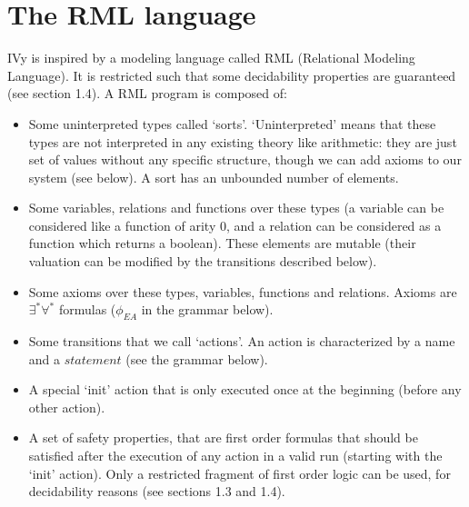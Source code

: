 \documentclass[11pt,a4paper,oldfontcommands,openany]{memoir}
\begin{document}
    \section{The RML language}

    IVy is inspired by a modeling language called RML (Relational Modeling Language). It is restricted such that some decidability properties are guaranteed (see section 1.4).
    A RML program is composed of:
    \begin{itemize}
        \item Some uninterpreted types called `sorts'. `Uninterpreted' means that these types are not interpreted in any existing theory like arithmetic:
        they are just set of values without any specific structure, though we can add axioms to our system (see below).
        A sort has an unbounded number of elements.
        \item Some variables, relations and functions over these types (a variable can be considered like a function of arity 0, and a relation can be considered as a function
        which returns a boolean). These elements are mutable (their valuation can be modified by the transitions described below).
        \item Some axioms over these types, variables, functions and relations. Axioms are \(\exists^*\forall^*\) formulas (\( \phi_{EA} \) in the grammar below).
        \item Some transitions that we call `actions'. An action is characterized by a name and a \(statement\) (see the grammar below).
        \item A special `init' action that is only executed once at the beginning (before any other action).
        \item A set of safety properties, that are first order formulas that should be satisfied after the execution of any action in a valid run (starting with the `init' action).
        Only a restricted fragment of first order logic can be used, for decidability reasons (see sections 1.3 and 1.4).
    \end{itemize}
\end{document}
